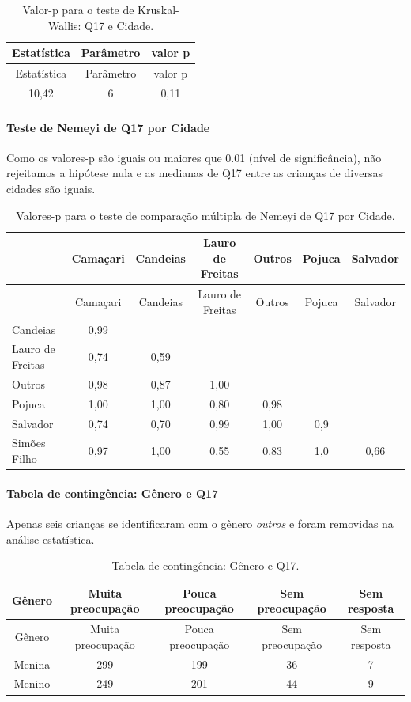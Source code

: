 \documentclass[]{article}
\let\oldparagraph\paragraph
\renewcommand{\paragraph}[1]{\oldparagraph{#1}\mbox{}}
\begin{document}
\begin{longtable}[]{@{}ccc@{}}
\caption{\label{tab:unnamed-chunk-197}Valor-p para o teste de Kruskal-Wallis: Q17 e Cidade.}\tabularnewline
\toprule
Estatística & Parâmetro & valor p\tabularnewline
\midrule
\endfirsthead
\toprule
Estatística & Parâmetro & valor p\tabularnewline
\midrule
\endhead
10,42 & 6 & 0,11\tabularnewline
\bottomrule
\end{longtable}

\hypertarget{teste-de-nemeyi-de-q17-por-cidade}{%
\paragraph{Teste de Nemeyi de Q17 por Cidade}\label{teste-de-nemeyi-de-q17-por-cidade}}

Como os valores-p são iguais ou maiores que 0.01 (nível de significância), não rejeitamos a hipótese nula e as medianas de Q17 entre as crianças de diversas cidades são iguais.

\begin{longtable}[]{@{}lcccccc@{}}
\caption{\label{tab:unnamed-chunk-199}Valores-p para o teste de comparação múltipla de Nemeyi de Q17 por Cidade.}\tabularnewline
\toprule
& Camaçari & Candeias & Lauro de Freitas & Outros & Pojuca & Salvador\tabularnewline
\midrule
\endfirsthead
\toprule
& Camaçari & Candeias & Lauro de Freitas & Outros & Pojuca & Salvador\tabularnewline
\midrule
\endhead
Candeias & 0,99 & & & & &\tabularnewline
Lauro de Freitas & 0,74 & 0,59 & & & &\tabularnewline
Outros & 0,98 & 0,87 & 1,00 & & &\tabularnewline
Pojuca & 1,00 & 1,00 & 0,80 & 0,98 & &\tabularnewline
Salvador & 0,74 & 0,70 & 0,99 & 1,00 & 0,9 &\tabularnewline
Simões Filho & 0,97 & 1,00 & 0,55 & 0,83 & 1,0 & 0,66\tabularnewline
\bottomrule
\end{longtable}

\cleardoublepage

\hypertarget{tabela-de-continguxeancia-guxeanero-e-q17}{%
\paragraph{Tabela de contingência: Gênero e Q17}\label{tabela-de-continguxeancia-guxeanero-e-q17}}

Apenas seis crianças se identificaram com o gênero \emph{outros} e foram removidas na análise estatística.

\begin{longtable}[]{@{}ccccc@{}}
\caption{\label{tab:unnamed-chunk-200}Tabela de contingência: Gênero e Q17.}\tabularnewline
\toprule
Gênero & Muita preocupação & Pouca preocupação & Sem preocupação & Sem resposta\tabularnewline
\midrule
\endfirsthead
\toprule
Gênero & Muita preocupação & Pouca preocupação & Sem preocupação & Sem resposta\tabularnewline
\midrule
\endhead
Menina & 299 & 199 & 36 & 7\tabularnewline
Menino & 249 & 201 & 44 & 9\tabularnewline
\bottomrule
\end{longtable}
\end{document}
